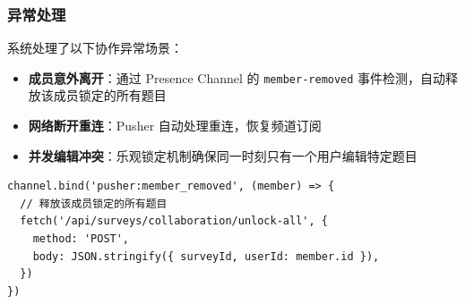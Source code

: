 \subsubsection{异常处理}

系统处理了以下协作异常场景：

\begin{itemize}
  \item \textbf{成员意外离开}：通过 Presence Channel 的 \texttt{member-removed} 事件检测，自动释放该成员锁定的所有题目
  \item \textbf{网络断开重连}：Pusher 自动处理重连，恢复频道订阅
  \item \textbf{并发编辑冲突}：乐观锁定机制确保同一时刻只有一个用户编辑特定题目
\end{itemize}

\begin{verbatim}
channel.bind('pusher:member_removed', (member) => {
  // 释放该成员锁定的所有题目
  fetch('/api/surveys/collaboration/unlock-all', {
    method: 'POST',
    body: JSON.stringify({ surveyId, userId: member.id }),
  })
})
\end{verbatim}
